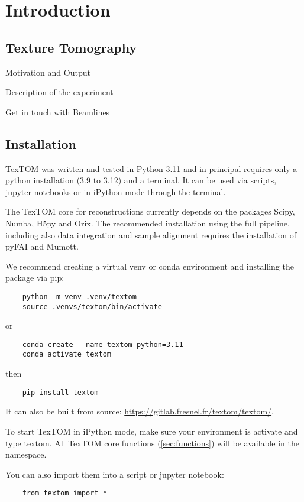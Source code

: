 \section{Introduction}

\subsection{Texture Tomography}

Motivation and Output

Description of the experiment

Get in touch with Beamlines

\subsection{Installation}

TexTOM was written and tested in Python 3.11 and in principal requires only a python installation (3.9 to 3.12) and a terminal.
It can be used via scripts, jupyter notebooks or in iPython mode through the terminal.

The TexTOM core for reconstructions currently depends on the packages Scipy, Numba, H5py and Orix.
The recommended installation using the full pipeline, including also data integration and sample alignment requires the installation of pyFAI and Mumott.

We recommend creating a virtual venv or conda environment and installing the package via pip:

\begin{verbatim}
    python -m venv .venv/textom
    source .venvs/textom/bin/activate
\end{verbatim}
or
\begin{verbatim}
    conda create --name textom python=3.11
    conda activate textom
\end{verbatim}
then
\begin{verbatim}
    pip install textom
\end{verbatim}

It can also be built from source: 
\url{https://gitlab.fresnel.fr/textom/textom/}.

To start TexTOM in iPython mode, make sure your environment is activate and type textom.
All TexTOM core functions (\ref{sec:functions}) will be available in the namespace.

You can also import them into a script or jupyter notebook:
\begin{verbatim}
    from textom import *
\end{verbatim}

